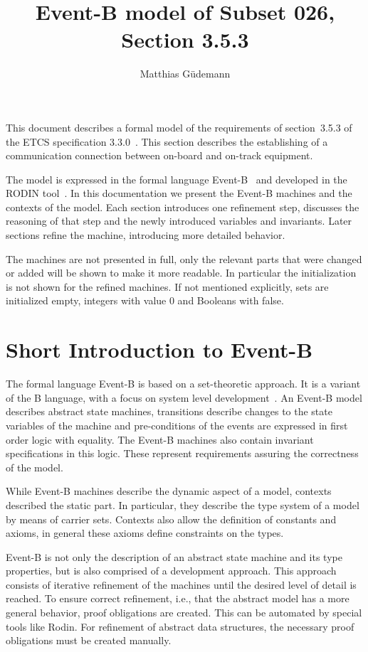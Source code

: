 \documentclass[10pt,a4paper]{article}
\author{Matthias Güdemann}
\title{Event-B model of Subset 026, Section 3.5.3}
\begin{document}
\maketitle

This document describes a formal model of the requirements of section~3.5.3 of
the ETCS specification 3.3.0~\cite{ETCS}. This section describes the
establishing of a communication connection between on-board and on-track
equipment.

The model is expressed in the formal language Event-B~\cite{eventB} and
developed in the RODIN tool~\cite{rodin}. In this documentation we present the
Event-B machines and the contexts of the model. Each section introduces one
refinement step, discusses the reasoning of that step and the newly introduced
variables and invariants. Later sections refine the machine, introducing more
detailed behavior.

The machines are not presented in full, only the relevant parts that were
changed or added will be shown to make it more readable. In particular the
initialization is not shown for the refined machines. If not mentioned
explicitly, sets are initialized empty, integers with value 0 and Booleans with
false.


\section{Short Introduction to Event-B}
\label{sec:short-intr-event}

The formal language Event-B is based on a set-theoretic approach. It is a
variant of the B language, with a focus on system level
development~\cite{eventbbook}. An Event-B model describes abstract state
machines, transitions describe changes to the state variables of the machine and
pre-conditions of the events are expressed in first order logic with
equality. The Event-B machines also contain invariant specifications in this
logic. These represent requirements assuring the correctness of the model.

While Event-B machines describe the dynamic aspect of a model, contexts
described the static part. In particular, they describe the type system of a
model by means of carrier sets. Contexts also allow the definition of constants
and axioms, in general these axioms define constraints on the types.

Event-B is not only the description of an abstract state machine and its type
properties, but is also comprised of a development approach. This approach
consists of iterative refinement of the machines until the desired level of
detail is reached. To ensure correct refinement, i.e., that the abstract model
has a more general behavior, proof obligations are created. This can be
automated by special tools like Rodin. For refinement of abstract data
structures, the necessary proof obligations must be created manually.
\end{document}
